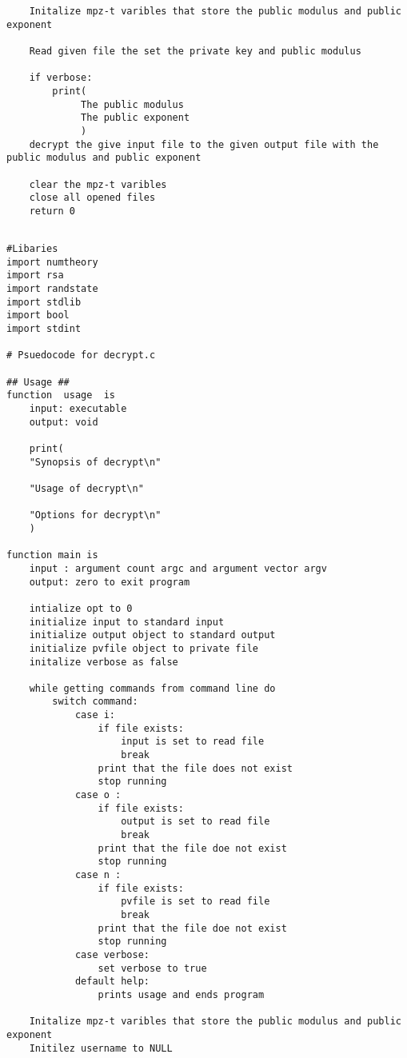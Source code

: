 \documentclass[11pt]{article} %
\begin{document}
\begin{flushleft}
\begin{lstlisting}
    Initalize mpz-t varibles that store the public modulus and public exponent

    Read given file the set the private key and public modulus

    if verbose:
        print(
             The public modulus
             The public exponent   
             )
    decrypt the give input file to the given output file with the public modulus and public exponent
    
    clear the mpz-t varibles
    close all opened files
    return 0
\end{lstlisting}

\begin{lstlisting}

#Libaries
import numtheory
import rsa
import randstate
import stdlib
import bool
import stdint

# Psuedocode for decrypt.c

## Usage ##
function  usage  is
    input: executable
    output: void

    print(
    "Synopsis of decrypt\n"

    "Usage of decrypt\n"

    "Options for decrypt\n"
    )

function main is
    input : argument count argc and argument vector argv
    output: zero to exit program
    
    intialize opt to 0
    initialize input to standard input
    initialize output object to standard output
    initialize pvfile object to private file 
    initalize verbose as false

    while getting commands from command line do
        switch command:
            case i:
                if file exists:
                    input is set to read file
                    break
                print that the file does not exist
                stop running
            case o :
                if file exists:
                    output is set to read file 
                    break
                print that the file doe not exist
                stop running
            case n :
                if file exists:
                    pvfile is set to read file 
                    break
                print that the file doe not exist
                stop running
            case verbose:
                set verbose to true
            default help:
                prints usage and ends program
    
    Initalize mpz-t varibles that store the public modulus and public exponent
    Initilez username to NULL


\end{lstlisting}
\end{flushleft}
\end{document}
